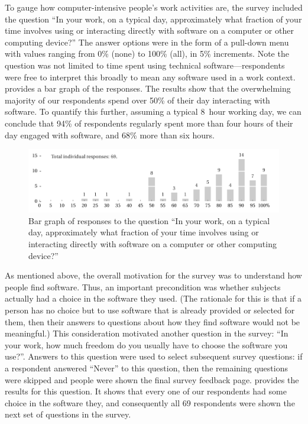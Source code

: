\documentclass{casicswhitepaper}
\newcommand{\totalRespondents}{69\xspace}
\begin{document}
To gauge how computer-intensive people's work activities are, the survey included the question ``In your work, on a typical day, approximately what fraction of your time involves using or interacting directly with software on a computer or other computing device?''  The answer options were in the form of a pull-down menu with values ranging from 0\% (none) to 100\% (all), in 5\% increments.  Note the question was not limited to time spent using technical software---respondents were free to interpret this broadly to mean any software used in a work context.   provides a bar graph of the responses.  The results show that the overwhelming majority of our respondents spend over 50\% of their day interacting with software.  To quantify this further, assuming a typical 8~hour working day, we can conclude that 94\% of respondents regularly spent more than four hours of their day engaged with software, and 68\% more than six hours.

\begin{figure}[bth]
  \centering
  \includegraphics{files/plots/bar-graph-time-spent-with-software.pdf}
  \vspace*{-4.5ex}
  \caption{Bar graph of responses to the question ``In your work, on a
    typical day, approximately what fraction of your time involves using or
    interacting directly with software on a computer or other computing
    device?''}
  \label{time-with-software}
\end{figure}

As mentioned above, the overall motivation for the survey was to understand how people find software.  Thus, an important precondition was whether subjects actually had a choice in the software they used.  (The rationale for this is that if a person has no choice but to use software that is already provided or selected for them, then their answers to questions about how they find software would not be meaningful.)  This consideration motivated another question in the survey: ``In your work, how much freedom do you usually have to choose the software you use?''.   Answers to this question were used to select subsequent survey questions: if a respondent answered ``Never'' to this question, then the remaining questions were skipped and people were shown the final survey feedback page.   provides the results for this question.  It shows that every one of our respondents had some choice in the software they, and consequently all \totalRespondents respondents were shown the next set of questions in the survey.  %
\end{document}
